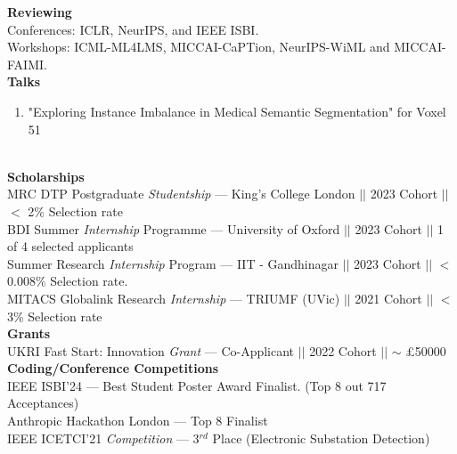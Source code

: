 \documentclass[letterpaper,10pt]{article}
\newcommand{\myuline}[1]{%
  \uline{\phantom{#1}}%
  \llap{\contour{white}{#1}}%
}
\begin{document}
\textbf{Reviewing} \\ [0.1cm]
Conferences: ICLR, NeurIPS, and IEEE ISBI. \\
Workshops: ICML-ML4LMS, MICCAI-CaPTion, NeurIPS-WiML and MICCAI-FAIMI. \\ [0.4cm]

\textbf{Talks}
\begin{enumerate}
    \item "Exploring Instance Imbalance in Medical Semantic Segmentation" for Voxel 51
\end{enumerate}

\textcolor{blue}{\textbf{\myuline{ACHEIVEMENTS}}} \\[0.2cm]
\textbf{Scholarships} \\ [0.1cm]
MRC DTP Postgraduate \textit{Studentship} \hspace*{2.8mm} --- King's College London $||$ 2023 Cohort $||$ $<$ 2\% Selection rate  \\ [0.1cm]
BDI Summer \textit{Internship} Programme \hspace*{4mm} --- University of Oxford $||$ 2023 Cohort $||$ 1 of 4 selected applicants \\ [0.1cm]
Summer Research \textit{Internship} Program \hspace*{1.5mm} --- IIT - Gandhinagar $||$ 2023 Cohort $||$ $<$ 0.008\% Selection rate. \\ [0.1cm]
MITACS Globalink Research \textit{Internship} --- TRIUMF (UVic) $||$ 2021 Cohort $||$ $<$ 3\% Selection rate \\ [0.2cm]

\textbf{Grants} \\ [0.1cm]
UKRI Fast Start: Innovation \textit{Grant} \hspace*{5.5mm} --- Co-Applicant $||$ 2022 Cohort $||$ $\sim$ \pounds50000 \\ [0.2cm]

\textbf{Coding/Conference Competitions} \\ [0.1cm]
IEEE ISBI'24 \hspace*{2.45cm} --- Best Student Poster Award Finalist. (Top 8 out 717 Acceptances) \\ [0.1cm]

Anthropic Hackathon London --- Top 8 Finalist \\ [0.1cm]

IEEE ICETCI'21 \textit{Competition}  --- 3$^{rd}$ Place (Electronic Substation Detection) \\ [0.4cm]
\end{document}
